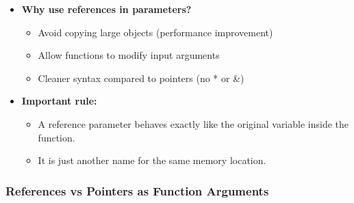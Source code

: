 \documentclass[10pt]{article}
\newcommand{\pbreak}{\vspace{30pt}}
\begin{document}
\begin{itemize}
    \pbreak

    \item \textbf{Why use references in parameters?}
    \begin{itemize}
        \item Avoid copying large objects (performance improvement)
        \item Allow functions to modify input arguments
        \item Cleaner syntax compared to pointers (no * or \&)
    \end{itemize}

    \pbreak

    \item \textbf{Important rule:}
    \begin{itemize}
        \item A reference parameter behaves exactly like the original variable inside the function.
        \item It is just another name for the same memory location.
    \end{itemize}
\end{itemize}

\newpage

\subsubsection{References vs Pointers as Function Arguments}
\end{document}

